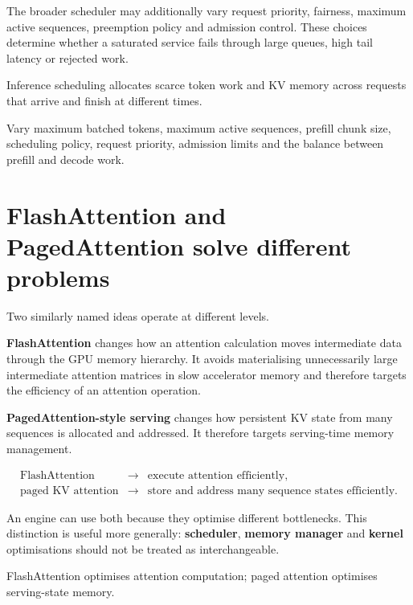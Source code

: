 The broader scheduler may additionally vary request priority, fairness, maximum active sequences, preemption policy and admission control.
These choices determine whether a saturated service fails through large queues, high tail latency or rejected work.

\begin{calloutmemoryhook}
Inference scheduling allocates scarce token work and KV memory across requests that arrive and finish at different times.
\end{calloutmemoryhook}

\begin{calloutdegreeofexperiment}
Vary maximum batched tokens, maximum active sequences, prefill chunk size, scheduling policy, request priority, admission limits and the balance between prefill and decode work.
\end{calloutdegreeofexperiment}


\section{FlashAttention and PagedAttention solve different problems}
\label{sec:inference-flash-paged}
Two similarly named ideas operate at different levels.

\textbf{FlashAttention} changes how an attention calculation moves intermediate data through the GPU memory hierarchy.
It avoids materialising unnecessarily large intermediate attention matrices in slow accelerator memory and therefore targets the efficiency of an attention operation.

\textbf{PagedAttention-style serving} changes how persistent KV state from many sequences is allocated and addressed.
It therefore targets serving-time memory management.

\[
\boxed{
\begin{array}{rcl}
\text{FlashAttention} &\rightarrow& \text{execute attention efficiently},\\[2mm]
\text{paged KV attention} &\rightarrow& \text{store and address many sequence states efficiently}.
\end{array}
}
\]

An engine can use both because they optimise different bottlenecks.
This distinction is useful more generally: \textbf{scheduler}, \textbf{memory manager} and \textbf{kernel} optimisations should not be treated as interchangeable.

\begin{calloutmemoryhook}
FlashAttention optimises attention computation; paged attention optimises serving-state memory.
\end{calloutmemoryhook}


